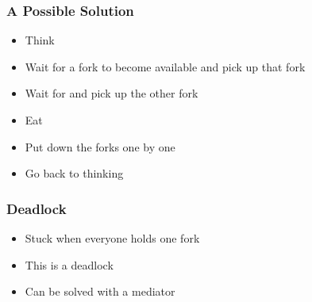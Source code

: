 \documentclass{beamer}
\begin{document}
\begin{frame}
\frametitle{A Possible Solution} 

\begin{itemize}
 \item Think
 \item Wait for a fork to become available and pick up that fork
 \item Wait for and pick up the other fork
 \item Eat
 \item Put down the forks one by one
 \item Go back to thinking
\end{itemize}

\end{frame}

\begin{frame}
\frametitle{Deadlock}

\begin{itemize}
 \item Stuck when everyone holds one fork
 \item This is a deadlock
 \item Can be solved with a mediator
\end{itemize}

\end{frame}
\end{document}
